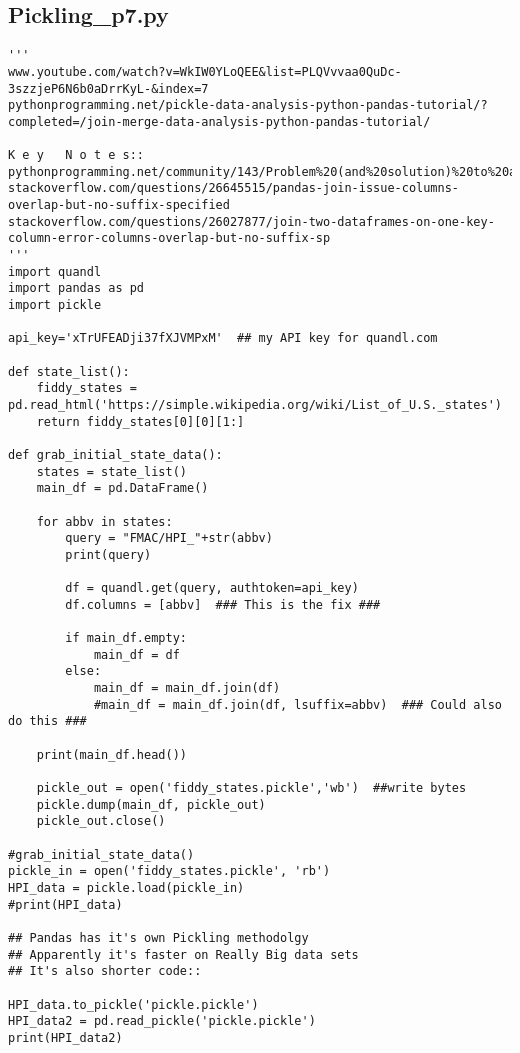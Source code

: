 \documentclass[11pt,a4paper]{article}
\begin{document}
\clearpage



\subsection{Pickling\_p7.py} 
\smallskip
\smallskip
\noindent 
\begin{lstlisting}
'''
www.youtube.com/watch?v=WkIW0YLoQEE&list=PLQVvvaa0QuDc-3szzjeP6N6b0aDrrKyL-&index=7
pythonprogramming.net/pickle-data-analysis-python-pandas-tutorial/?completed=/join-merge-data-analysis-python-pandas-tutorial/

K e y   N o t e s::
pythonprogramming.net/community/143/Problem%20(and%20solution)%20to%20a%20pandas%20join%20issue%20in%20data%20analysis%20tutorial/
stackoverflow.com/questions/26645515/pandas-join-issue-columns-overlap-but-no-suffix-specified
stackoverflow.com/questions/26027877/join-two-dataframes-on-one-key-column-error-columns-overlap-but-no-suffix-sp
'''
import quandl
import pandas as pd
import pickle

api_key='xTrUFEADji37fXJVMPxM'  ## my API key for quandl.com

def state_list():
    fiddy_states = pd.read_html('https://simple.wikipedia.org/wiki/List_of_U.S._states')
    return fiddy_states[0][0][1:]

def grab_initial_state_data():
    states = state_list()
    main_df = pd.DataFrame()

    for abbv in states:
        query = "FMAC/HPI_"+str(abbv)
        print(query)
        
        df = quandl.get(query, authtoken=api_key)
        df.columns = [abbv]  ### This is the fix ###

        if main_df.empty:
            main_df = df
        else:
            main_df = main_df.join(df)
            #main_df = main_df.join(df, lsuffix=abbv)  ### Could also do this ###

    print(main_df.head())
    
    pickle_out = open('fiddy_states.pickle','wb')  ##write bytes
    pickle.dump(main_df, pickle_out)
    pickle_out.close()        

#grab_initial_state_data()
pickle_in = open('fiddy_states.pickle', 'rb')
HPI_data = pickle.load(pickle_in)
#print(HPI_data)

## Pandas has it's own Pickling methodolgy
## Apparently it's faster on Really Big data sets
## It's also shorter code::

HPI_data.to_pickle('pickle.pickle')
HPI_data2 = pd.read_pickle('pickle.pickle')
print(HPI_data2)
\end{lstlisting}
\clearpage
\end{document}
